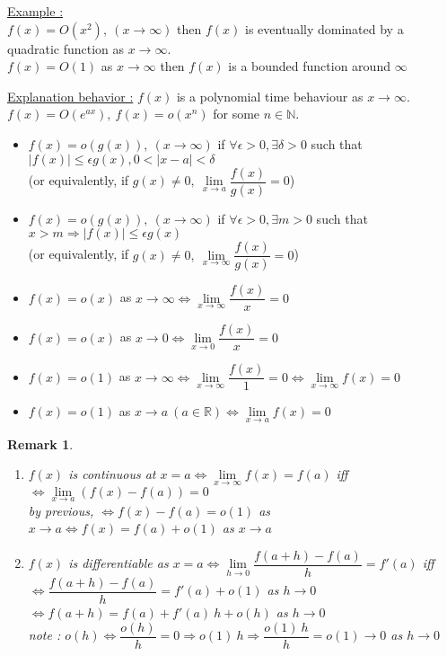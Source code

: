 \documentclass[a4paper,10pt]{article}
\newtheorem{remark}{Remark}
\newcommand{\R}{\mathbb{R}}
\newcommand{\N}{\mathbb{N}}
\begin{document}
\underline{Example :} \\$ f(x) = O(x^2), \ (x\rightarrow \infty) $ then $ f(x) $ is eventually dominated by a quadratic function as $ x \rightarrow \infty $.\\
$ f(x) = O(1) $ as $ x \rightarrow \infty $ then $ f(x) $ is a bounded function around $ \infty $

\underline{Explanation behavior :} $ f(x) $ is a polynomial time behaviour as $ x \rightarrow \infty $. $ f(x) = O(e^{ax}), \ f(x) = o(x^n) $ for some $ n \in \N $.
\begin{itemize}
	\item $ f(x) = o(g(x)), \ (x \rightarrow \infty) $ if $ \forall\epsilon>0, \exists \delta >0 $ such that $ |f(x)| \leq \epsilon g(x), 0 < |x-a| < \delta $ \\ (or equivalently, if $ g(x)\neq 0, \ \lim\limits_{x\rightarrow a} \dfrac{f(x)}{g(x)} =0 $)
	\item $ f(x) = o(g(x)), \ (x \rightarrow \infty) $ if $ \forall\epsilon>0, \exists m >0 $ such that $ x>m \Rightarrow |f(x)| \leq \epsilon g(x) $ \\ (or equivalently, if $ g(x)\neq 0, \ \lim\limits_{x\rightarrow \infty} \dfrac{f(x)}{g(x)} =0 $)
	\item $ f(x) = o(x) $ as $ x \rightarrow \infty \Leftrightarrow \lim\limits_{x\rightarrow \infty} \dfrac{f(x)}{x} =0$
	\item $ f(x) = o(x) $ as $ x \rightarrow 0 \Leftrightarrow \lim\limits_{x\rightarrow 0} \dfrac{f(x)}{x} =0$
	\item $ f(x) = o(1) $ as $ x \rightarrow \infty \Leftrightarrow \lim\limits_{x \rightarrow \infty} \dfrac{f(x)}{1} =0 \Leftrightarrow \lim\limits_{x \rightarrow \infty} f(x) =0 $ 
	\item $ f(x) = o(1) $ as $ x \rightarrow a \ (a \in \R)  \Leftrightarrow \lim\limits_{x \rightarrow a} f(x) =0 $ 	
\end{itemize}

\begin{remark}
	\begin{enumerate}
		\item $ f(x) $ is continuous at $ x=a \Leftrightarrow \lim\limits_{x \rightarrow \infty} f(x) =f(a) $ iff $ \Leftrightarrow \lim\limits_{x \rightarrow a} (f(x)-f(a)) =0 $\\
		by previous, $ \Leftrightarrow f(x) - f(a) = o(1) $ as $ x \rightarrow a \Leftrightarrow f(x) = f(a) +o(1) $ as $ x \rightarrow a $ 
		\item $ f(x) $ is differentiable as $ x=a \Leftrightarrow \lim\limits_{h\rightarrow 0}\dfrac{f(a+h)-f(a)}{h} = f'(a) $ iff $ \Leftrightarrow \dfrac{f(a+h)-f(a)}{h} = f'(a) + o(1) $ as $ h \rightarrow 0 $\\
		$ \Leftrightarrow f(a+h)=f(a)+f'(a) \ h + o(h) $ as $ h\rightarrow 0 $\\
		note : $ o(h) \Leftrightarrow \dfrac{o(h)}{h}=0 \Rightarrow o(1) \ h \Rightarrow \dfrac{o(1) \ h}{h} = o(1) \rightarrow 0 $ as $ h\rightarrow 0 $
	\end{enumerate}
\end{remark}
\end{document}
